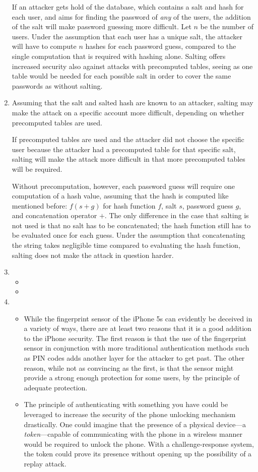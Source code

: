 \begin{enumerate}
If an attacker gets hold of the database, which contains a salt and hash for each user, and aims for finding the password of \emph{any} of the users, the addition of the salt will make password guessing more difficult. Let $n$ be the number of users. Under the assumption that each user has a unique salt, the attacker will have to compute $n$ hashes for each password guess, compared to the single computation that is required with hashing alone. Salting offers increased security also against attacks with precomputed tables, seeing as one table would be needed for each possible salt in order to cover the same passwords as without salting.
\item %
Assuming that the salt and salted hash are known to an attacker, salting may make the attack on a specific account more difficult, depending on whether precomputed tables are used.

If precomputed tables are used and the attacker did not choose the specific user because the attacker had a precomputed table for that specific salt, salting will make the attack more difficult in that more precomputed tables will be required.

Without precomputation, however, each password guess will require one computation of a hash value, assuming that the hash is computed like mentioned before: $f(s + g)$ for hash function $f$, salt $s$, password guess $g$, and concatenation operator $+$. The only difference in the case that salting is not used is that no salt has to be concatenated; the hash function still has to be evaluated once for each guess. Under the assumption that concatenating the string takes negligible time compared to evaluating the hash function, salting does not make the attack in question harder.
\item \highergradesonly
  \begin{itemize}
    \item
    \item
  \end{itemize}
\item %
  \begin{itemize}
    \item
      While the fingerprint sensor of the iPhone 5s can evidently be deceived in a variety of ways, there are at least two reasons that it is a good addition to the iPhone security. The first reason is that the use of the fingerprint sensor in conjunction with more traditional authentication methods such as PIN codes adds another layer for the attacker to get past. The other reason, while not as convincing as the first, is that the sensor might provide a strong enough protection for some users, by the principle of adequate protection.
    \item
      The principle of authenticating with something you have could be leveraged to increase the security of the phone unlocking mechanism drastically. One could imagine that the presence of a physical device---a \textit{token}---capable of communicating with the phone in a wireless manner would be required to unlock the phone. With a challenge-response system, the token could prove its presence without opening up the possibility of a replay attack.


\end{itemize}
\end{enumerate}

